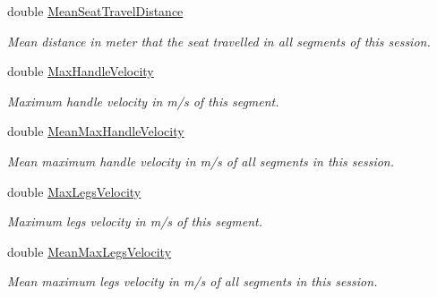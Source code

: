 \begin{DoxyCompactItemize}
double \hyperlink{struct_rowing_monitor_1_1_model_1_1_util_1_1_rowing_meta_data_adfa552780cb390fa805206e24b1c7a70}{Mean\+Seat\+Travel\+Distance}
\begin{DoxyCompactList}\small\item\em Mean distance in meter that the seat travelled in all segments of this session. \end{DoxyCompactList}\item 
double \hyperlink{struct_rowing_monitor_1_1_model_1_1_util_1_1_rowing_meta_data_a047d5fd079a23902d4390d17c5c85a6a}{Max\+Handle\+Velocity}
\begin{DoxyCompactList}\small\item\em Maximum handle velocity in m/s of this segment. \end{DoxyCompactList}\item 
double \hyperlink{struct_rowing_monitor_1_1_model_1_1_util_1_1_rowing_meta_data_af9c451462cc99b03c003b2f8f95e1fe3}{Mean\+Max\+Handle\+Velocity}
\begin{DoxyCompactList}\small\item\em Mean maximum handle velocity in m/s of all segments in this session. \end{DoxyCompactList}\item 
double \hyperlink{struct_rowing_monitor_1_1_model_1_1_util_1_1_rowing_meta_data_af6bde9eeda004b3614bd1cacd68771e8}{Max\+Legs\+Velocity}
\begin{DoxyCompactList}\small\item\em Maximum legs velocity in m/s of this segment. \end{DoxyCompactList}\item 
double \hyperlink{struct_rowing_monitor_1_1_model_1_1_util_1_1_rowing_meta_data_a4cdba49e59a66f68b5df5ca6ab4742cb}{Mean\+Max\+Legs\+Velocity}
\begin{DoxyCompactList}\small\item\em Mean maximum legs velocity in m/s of all segments in this session. \end{DoxyCompactList}\item 

\end{DoxyCompactItemize}
